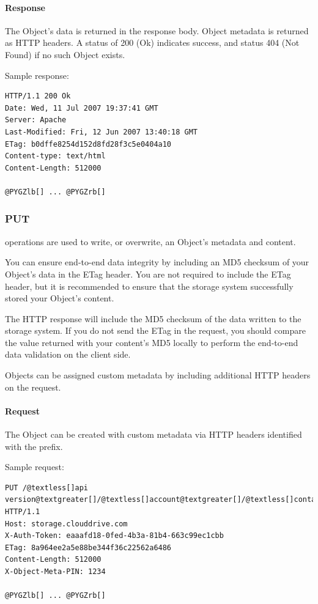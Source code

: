 \documentclass[letterpaper,10pt,english]{manual}
\begin{document}
\paragraph{Response}

The Object's data is returned in the response body.  Object metadata is
returned as HTTP headers.  A status of 200 (Ok) indicates success, and
status 404 (Not Found) if no such Object exists.

Sample response:

\begin{Verbatim}[commandchars=@\[\]]
HTTP/1.1 200 Ok
Date: Wed, 11 Jul 2007 19:37:41 GMT
Server: Apache
Last-Modified: Fri, 12 Jun 2007 13:40:18 GMT
ETag: b0dffe8254d152d8fd28f3c5e0404a10
Content-type: text/html
Content-Length: 512000

@PYGZlb[] ... @PYGZrb[]
\end{Verbatim}


\subsubsection{PUT}

 operations are used to write, or overwrite, an Object's metadata
and content.

You can ensure end-to-end data integrity by including an MD5 checksum of
your Object's data in the ETag header.  You are not required to include
the ETag header, but it is recommended to ensure that the storage system
successfully stored your Object's content.

The HTTP response will include the MD5 checksum of the data written to
the storage system.  If you do not send the ETag in the request, you
should compare the value returned with your content's MD5 locally to
perform the end-to-end data validation on the client side.

Objects can be assigned custom metadata by including additional HTTP
headers on the  request.


\paragraph{Request}

The Object can be created with custom metadata via HTTP headers
identified with the  prefix.

Sample request:

\begin{Verbatim}[commandchars=@\[\]]
PUT /@textless[]api version@textgreater[]/@textless[]account@textgreater[]/@textless[]container@textgreater[]/@textless[]object@textgreater[] HTTP/1.1
Host: storage.clouddrive.com
X-Auth-Token: eaaafd18-0fed-4b3a-81b4-663c99ec1cbb
ETag: 8a964ee2a5e88be344f36c22562a6486
Content-Length: 512000
X-Object-Meta-PIN: 1234

@PYGZlb[] ... @PYGZrb[]
\end{Verbatim}
\end{document}
